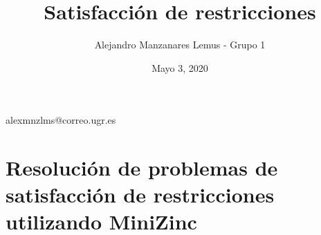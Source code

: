 \documentclass[10pt]{report}
\author{Alejandro Manzanares Lemus - Grupo 1}
\title{Satisfacción de restricciones}
\date{Mayo 3, 2020}
\begin{document}
            {}
            {alexmnzlms@correo.ugr.es}

\tableofcontents

\chapter{Resolución de problemas de satisfacción de restricciones utilizando MiniZinc}





% 

% 
% 
% 

\end{document}
